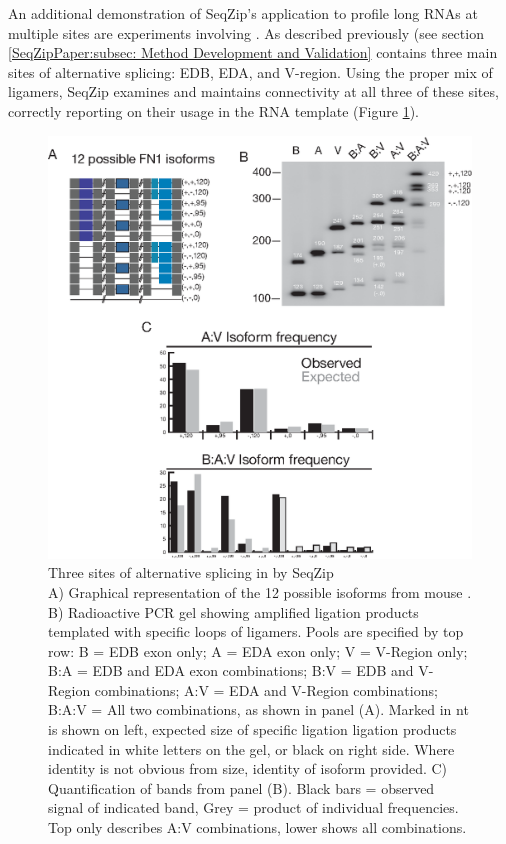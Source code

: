     An additional demonstration of SeqZip's application to profile long RNAs at multiple sites are experiments involving \fn{}. As described previously (see section \ref{SeqZipPaper:subsec: Method Development and Validation} \fn{} contains three main sites of alternative splicing: EDB, EDA, and V-region. Using the proper mix of ligamers, SeqZip examines and maintains connectivity at all three of these sites, correctly reporting on their usage in the RNA template (Figure \ref{SeqZipMethod:fig:Three Site FN1 by SeqZip}).

    \begin{figure} %
            \centering 
            \includegraphics{Figures/SeqZipMethod/fn1ThreeSite.eps}
            \caption[Three sites of alternative splicing in \fn{} by SeqZip]
            {
              Three sites of alternative splicing in \fn{} by SeqZip\\[0.25cm]
              A) Graphical representation of the 12 possible isoforms from mouse \fn{}. B) Radioactive PCR gel showing amplified ligation products templated with specific loops of ligamers. Pools are specified by top row: B = EDB exon only; A = EDA exon only; V = V-Region only; B:A = EDB and EDA exon combinations; B:V = EDB and V-Region combinations; A:V = EDA and V-Region combinations; B:A:V = All two combinations, as shown in panel (A). Marked in nt is shown on left, expected size of specific ligation ligation products indicated in white letters on the gel, or black on right side. Where identity is not obvious from size, identity of isoform provided. C) Quantification of bands from panel (B). Black bars = observed signal of indicated band, Grey = product of individual frequencies. Top only describes A:V combinations, lower shows all combinations.
              }
            \label{SeqZipMethod:fig:Three Site FN1 by SeqZip}
            \end{figure}

